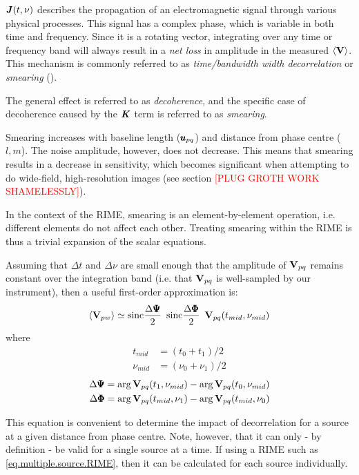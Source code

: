 \pg
$\textbf{\emph{J}}(t,\nu)$ describes the propagation of an electromagnetic signal through various physical processes. This signal has a complex phase, which is variable in both time and frequency. Since it is a rotating vector, integrating over any time or frequency band will always result in a \emph{net loss} in amplitude in the measured $\langle\textbf{V}\rangle$. This mechanism is commonly referred to as \emph{time/bandwidth width decorrelation} or \emph{smearing} (\cite{2011A&A...527A.106S}).

\pg
The general effect is referred to as \emph{decoherence}, and the specific case of decoherence caused by the $\textbf{\emph{K}}$ term is referred to as \emph{smearing}.

\pg Smearing increases with baseline length ($\pmb{u}_{pq}$) and distance from phase centre ($l,m$). The noise amplitude, however, does not decrease. This means that smearing results in a decrease in sensitivity, which becomes significant when attempting to do wide-field, high-resolution images (see section \textcolor{red}{[PLUG GROTH WORK SHAMELESSLY]}).

\pg 
In the context of the RIME, smearing is an element-by-element operation, i.e. different elements do not affect each other. Treating smearing within the RIME is thus a trivial expansion of the scalar equations.

\pg
Assuming that $\Delta t$ and $\Delta \nu$ are small enough that the amplitude of $\textbf{V}_{pq}$ remains constant over the integration band (i.e. that $\textbf{V}_{pq}$ is well-sampled by our instrument), then a useful first-order approximation is:
\begin{equation}
\langle \textbf{V}_{pw} \rangle \simeq \text{sinc}\frac{\Delta \pmb{\Psi}}{2} \enskip \text{sinc}\frac{\Delta \pmb{\Phi}}{2} \enskip \textbf{V}_{pq}(t_{mid},\nu_{mid})
\end{equation}
where
\begin{align}
t_{mid}           &= (t_0 + t_1)/2\\
\nu_{mid}         &= (\nu_0 + \nu_1)/2
\end{align}
\begin{align}
\Delta \pmb{\Psi} &= \arg \textbf{V}_{pq}(t_1,\nu_{mid}) - \arg \textbf{V}_{pq}(t_0, \nu_{mid})\\
\Delta \pmb{\Phi} &= \arg \textbf{V}_{pq}(t_{mid},\nu_1) - \arg \textbf{V}_{pq}(t_{mid}, \nu_0)
\end{align}

\pg
This equation is convenient to determine the impact of decorrelation for a source at a given distance from phase centre. Note, however, that it can only - by definition - be valid for a single source at a time. If using a RIME such as \cref{eq.multiple.source.RIME}, then it can be calculated for each source individually.

